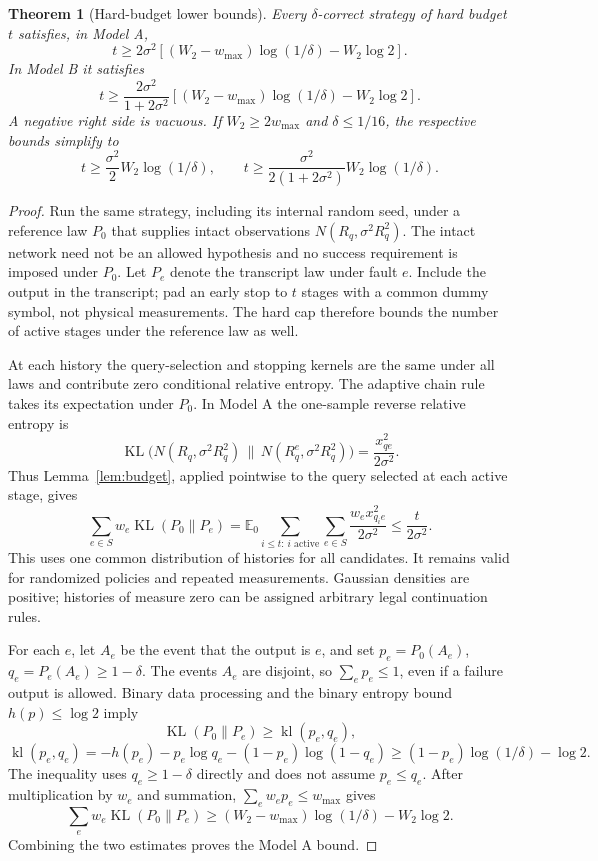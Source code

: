 \documentclass[11pt,letterpaper]{article}
\newtheorem{theorem}{Theorem}
\DeclareMathOperator{\KL}{KL}
\DeclareMathOperator{\kl}{kl}
\begin{document}
\begin{theorem}[Hard-budget lower bounds]\label{thm:lower}
Every $\delta$-correct strategy of hard budget $t$ satisfies, in Model A,
\[
 t\ge 2\sigma^2\left[(W_2-w_{\max})\log(1/\delta)-W_2\log2\right].
\]
In Model B it satisfies
\[
 t\ge \frac{2\sigma^2}{1+2\sigma^2}
 \left[(W_2-w_{\max})\log(1/\delta)-W_2\log2\right].
\]
A negative right side is vacuous. If $W_2\ge2w_{\max}$ and $\delta\le1/16$, the respective bounds simplify to
\[
 t\ge\frac{\sigma^2}{2}W_2\log(1/\delta),\qquad
 t\ge\frac{\sigma^2}{2(1+2\sigma^2)}W_2\log(1/\delta).
\]
\end{theorem}
\begin{proof}
Run the same strategy, including its internal random seed, under a reference law $P_0$ that supplies intact observations $N(R_q,\sigma^2R_q^2)$. The intact network need not be an allowed hypothesis and no success requirement is imposed under $P_0$. Let $P_e$ denote the transcript law under fault $e$. Include the output in the transcript; pad an early stop to $t$ stages with a common dummy symbol, not physical measurements. The hard cap therefore bounds the number of active stages under the reference law as well.

At each history the query-selection and stopping kernels are the same under all laws and contribute zero conditional relative entropy. The adaptive chain rule takes its expectation under $P_0$. In Model A the one-sample reverse relative entropy is
\[
 \KL\bigl(N(R_q,\sigma^2R_q^2)\,\|\,N(R_q^e,\sigma^2R_q^2)\bigr)
 =\frac{x_{qe}^2}{2\sigma^2}.
\]
Thus Lemma~\ref{lem:budget}, applied pointwise to the query selected at each active stage, gives
\[
 \sum_{e\in S}w_e\KL(P_0\|P_e)
 =\mathbb E_0\sum_{i\le t:\,i\text{ active}}
   \sum_{e\in S}\frac{w_ex_{q_i e}^2}{2\sigma^2}
 \le\frac{t}{2\sigma^2}.
\]
This uses one common distribution of histories for all candidates. It remains valid for randomized policies and repeated measurements. Gaussian densities are positive; histories of measure zero can be assigned arbitrary legal continuation rules.

For each $e$, let $A_e$ be the event that the output is $e$, and set $p_e=P_0(A_e)$, $q_e=P_e(A_e)\ge1-\delta$. The events $A_e$ are disjoint, so $\sum_ep_e\le1$, even if a failure output is allowed. Binary data processing and the binary entropy bound $h(p)\le\log2$ imply
\[
 \KL(P_0\|P_e)\ge\kl(p_e,q_e),
\]
\[
 \kl(p_e,q_e)=-h(p_e)-p_e\log q_e-(1-p_e)\log(1-q_e)
 \ge(1-p_e)\log(1/\delta)-\log2.
\]
The inequality uses $q_e\ge1-\delta$ directly and does not assume $p_e\le q_e$. After multiplication by $w_e$ and summation, $\sum_ew_ep_e\le w_{\max}$ gives
\[
 \sum_ew_e\KL(P_0\|P_e)
 \ge(W_2-w_{\max})\log(1/\delta)-W_2\log2.
\]
Combining the two estimates proves the Model A bound.


\end{proof}
\end{document}
